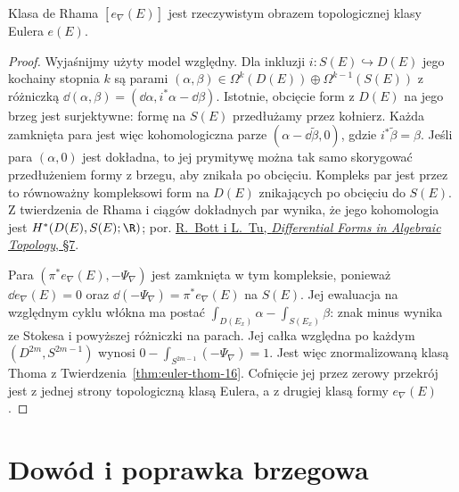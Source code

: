 \begin{stwierdzenie}
\label{prop:euler-identification-26}
Klasa de Rhama $[e_\nabla(E)]$
jest rzeczywistym obrazem
topologicznej klasy Eulera $e(E)$.
\end{stwierdzenie}
\begin{proof}
Wyjaśnijmy użyty model względny. Dla inkluzji
$i:S(E)\hookrightarrow D(E)$ jego kochainy
stopnia $k$ są parami
$(\alpha,\beta)\in\Omega^k(D(E))\oplus
\Omega^{k-1}(S(E))$ z różniczką
$\dd(\alpha,\beta)=(\dd\alpha,i^*\alpha-\dd\beta)$.
Istotnie, obcięcie form z $D(E)$ na jego brzeg
jest surjektywne: formę na $S(E)$ przedłużamy
przez kołnierz. Każda zamknięta para jest więc
kohomologiczna parze $(\alpha-\dd\widetilde\beta,0)$,
gdzie $i^*\widetilde\beta=\beta$.
Jeśli para $(\alpha,0)$ jest dokładna, to jej
prymitywę można tak samo skorygować przedłużeniem
formy z brzegu, aby znikała po obcięciu.
Kompleks par jest przez to równoważny kompleksowi
form na $D(E)$ znikających po obcięciu do $S(E)$.
Z twierdzenia de Rhama i ciągów dokładnych par
wynika, że jego kohomologia jest
$H^*(D(E),S(E);\R)$; por.
\href{https://doi.org/10.1007/978-1-4757-3951-0}
{R.\ Bott i L.\ Tu, \emph{Differential Forms in Algebraic Topology},
§7}.

Para $(\pi^*e_\nabla(E),-\Psi_\nabla)$
jest zamknięta w tym kompleksie, ponieważ
$\dd e_\nabla(E)=0$ oraz
$\dd(-\Psi_\nabla)=\pi^*e_\nabla(E)$ na $S(E)$.
Jej ewaluacja na względnym cyklu włókna
ma postać $\int_{D(E_x)}\alpha-\int_{S(E_x)}\beta$:
znak minus wynika ze Stokesa i powyższej
różniczki na parach.
Jej całka względna po każdym
$(D^{2m},S^{2m-1})$ wynosi
$0-\int_{S^{2m-1}}(-\Psi_\nabla)=1$.
Jest więc znormalizowaną klasą
Thoma z Twierdzenia~\ref{thm:euler-thom-16}.
Cofnięcie jej przez zerowy przekrój
jest z jednej strony topologiczną
klasą Eulera, a z drugiej klasą
formy $e_\nabla(E)$.
\end{proof}

\section{Dowód i poprawka brzegowa}
\label{sec:CGB-proof-26}

